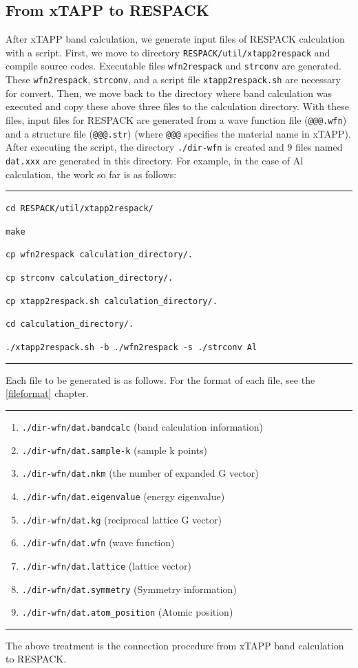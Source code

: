 \documentclass{article}
\begin{document}
\subsection{\label{xtapp2respack}From xTAPP to RESPACK}
After {\sc xTAPP} band calculation, we generate input files of RESPACK calculation with a script. First, we move to directory {\tt RESPACK/util/xtapp2respack} and compile source codes. Executable files {\tt wfn2respack} and {\tt strconv} are generated. These {\tt wfn2respack}, {\tt strconv}, and a script file {\tt xtapp2respack.sh} are necessary for convert. Then, we move back to the directory where band calculation was executed and copy these above three files to the calculation directory. With these files, input files for RESPACK are generated from a wave function file ({\tt @@@.wfn}) and a structure file ({\tt @@@.str}) (where {\tt @@@} specifies the material name in {\sc xTAPP}). After executing the script, the directory {\tt ./dir-wfn} is created and 9 files named {\tt dat.xxx} are generated in this directory. For example, in the case of Al calculation, the work so far is as follows:  
\vspace{3mm}\hrule\vspace{3mm}
\texttt{cd RESPACK/util/xtapp2respack/}

\texttt{make}

\texttt{cp wfn2respack calculation\_directory/.}

\texttt{cp strconv calculation\_directory/.}

\texttt{cp xtapp2respack.sh calculation\_directory/.}

\texttt{cd calculation\_directory/.}

\texttt{./xtapp2respack.sh -b ./wfn2respack -s ./strconv Al}
\vspace{3mm}\hrule\vspace{3mm}
Each file to be generated is as follows. For the format of each file, see the \ref{fileformat} chapter.
\vspace{3mm}\hrule
\begin{enumerate}
\item \verb+./dir-wfn/dat.bandcalc+ (band calculation information)
\item \verb+./dir-wfn/dat.sample-k+ (sample k points)
\item \verb+./dir-wfn/dat.nkm+ (the number of expanded G vector)
\item \verb+./dir-wfn/dat.eigenvalue+ (energy eigenvalue)
\item \verb+./dir-wfn/dat.kg+ (reciprocal lattice G vector)
\item \verb+./dir-wfn/dat.wfn+ (wave function)
\item \verb+./dir-wfn/dat.lattice+ (lattice vector)
\item \verb+./dir-wfn/dat.symmetry+ (Symmetry information)
\item {\tt ./dir-wfn/dat.atom\_position} (Atomic position)
\end{enumerate}
\hrule\vspace{3mm}
The above treatment is the connection procedure from {\sc xTAPP} band calculation to RESPACK.
\end{document}
